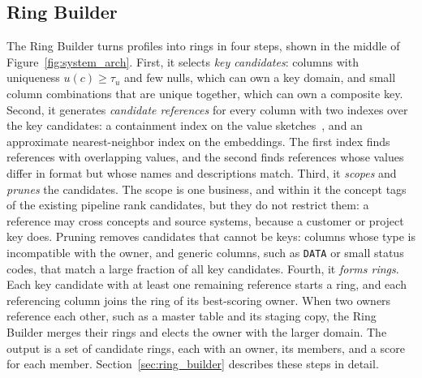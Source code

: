 \subsection{Ring Builder}
\label{sec:arch_ringbuilder}
The Ring Builder turns profiles into rings in four steps, shown in the middle of Figure~\ref{fig:system_arch}.
First, it selects \emph{key candidates}: columns with uniqueness $u(c) \geq \tau_u$ and few nulls, which can own a key domain, and small column combinations that are unique together, which can own a composite key.
Second, it generates \emph{candidate references} for every column with two indexes over the key candidates: a containment index on the value sketches~\cite{DBLP:journals/pvldb/ZhuNPM16}, and an approximate nearest-neighbor index on the embeddings.
The first index finds references with overlapping values, and the second finds references whose values differ in format but whose names and descriptions match.
Third, it \emph{scopes} and \emph{prunes} the candidates.
The scope is one business, and within it the concept tags of the existing pipeline rank candidates, but they do not restrict them: a reference may cross concepts and source systems, because a customer or project key does.
Pruning removes candidates that cannot be keys: columns whose type is incompatible with the owner, and generic columns, such as \texttt{DATA} or small status codes, that match a large fraction of all key candidates.
Fourth, it \emph{forms rings}.
Each key candidate with at least one remaining reference starts a ring, and each referencing column joins the ring of its best-scoring owner.
When two owners reference each other, such as a master table and its staging copy, the Ring Builder merges their rings and elects the owner with the larger domain.
The output is a set of candidate rings, each with an owner, its members, and a score for each member.
Section~\ref{sec:ring_builder} describes these steps in detail.


